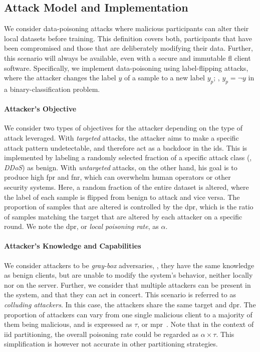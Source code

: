 \subsection{Attack Model and Implementation\label{sec:assess.method.poisoning}}

We consider data-poisoning attacks where malicious participants can alter their local datasets before training.
This definition covers both, participants that have been compromised and those that are deliberately modifying their data.
Further, this scenario will always be available, even with a secure and immutable \gls{fl} client software.
Specifically, we implement data-poisoning using label-flipping attacks, where the attacker changes the label $y$ of a sample to a new label $y_p$; \ie, $y_p = \neg y$ in a binary-classification problem.

\paragraph{Attacker's Objective}

We consider two types of objectives for the attacker depending on the type of attack leveraged.
With \emph{targeted} attacks, the attacker aims to make a specific attack pattern undetectable, and therefore act as a backdoor in the \gls{ids}.
This is implemented by labeling a randomly selected fraction of a specific attack class (\eg, \emph{DDoS}) as benign.
With \emph{untargeted} attacks, on the other hand, his goal is to produce high \gls{fpr} and \gls{fnr}, which can overwhelm human operators or other security systems.
Here, a random fraction of the entire dataset is altered, where the label of each sample is flipped from benign to attack and vice versa.
The proportion of samples that are altered is controlled by the \gls{dpr}, which is the ratio of samples matching the target that are altered by each attacker on a specific round.
We note the \gls{dpr}, or \emph{local poisoning rate}, as $\alpha$.


\paragraph{Attacker's Knowledge and Capabilities}

We consider attackers to be \emph{gray-box} adversaries, \ie, they have the same knowledge as benign clients, but are unable to modify the system's behavior, neither locally nor on the server.  
Further, we consider that multiple attackers can be present in the system, and that they can act in concert. 
This scenario is referred to as \emph{colluding attackers}.
In this case, the attackers share the same target and \gls{dpr}.
The proportion of attackers can vary from one single malicious client to a majority of them being malicious, and is expressed as $\tau$, or \gls{mpr}~\cite{merzouk_Parameterizingpoisoningattacks_2023}.
Note that in the context of \gls{iid} partitioning, the overall poisoning rate could be regarded as $\alpha \times \tau$.
This simplification is however not accurate in other partitioning strategies.


